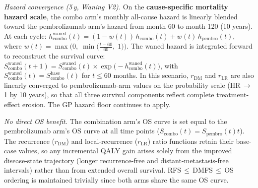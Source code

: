 \documentclass[11pt,a4paper]{article}
\begin{document}
\textit{Hazard convergence (5\,y, Waning V2).} On the \textbf{cause-specific mortality hazard scale}, the combo arm's monthly all-cause hazard is linearly blended toward the pembrolizumab arm's hazard from month 60 to month 120 (10 years). At each cycle: $h_{\text{combo}}^{\text{waned}}(t) = (1 - w(t))\,h_{\text{combo}}(t) + w(t)\,h_{\text{pembro}}(t)$, where $w(t) = \max\bigl(0,\; \min\bigl(\frac{t - 60}{60},\; 1\bigr)\bigr)$. The waned hazard is integrated forward to reconstruct the survival curve: $S_{\text{combo}}^{\text{waned}}(t+1) = S_{\text{combo}}^{\text{waned}}(t) \times \exp\bigl(-h_{\text{combo}}^{\text{waned}}(t)\bigr)$, with $S_{\text{combo}}^{\text{waned}}(t) = S_{\text{combo}}^{\text{base}}(t)$ for $t \leq 60$ months. In this scenario, $r_{\text{DM}}$ and $r_{\text{LR}}$ are also linearly converged to pembrolizumab-arm values on the probability scale (HR\,$\to$\,1 by 10 years), so that all three survival components reflect complete treatment-effect erosion. The GP hazard floor continues to apply.

\textit{No direct OS benefit.} The combination arm's OS curve is set equal to the pembrolizumab arm's OS curve at all time points ($S_{\text{combo}}(t) = S_{\text{pembro}}(t)$\;\forall\;$t$). The recurrence ($r_{\text{DM}}$) and local-recurrence ($r_{\text{LR}}$) ratio functions retain their base-case values, so any incremental QALY gain arises solely from the improved disease-state trajectory (longer recurrence-free and distant-metastasis-free intervals) rather than from extended overall survival. RFS\,$\leq$\,DMFS\,$\leq$\,OS ordering is maintained trivially since both arms share the same OS curve.
\end{document}
